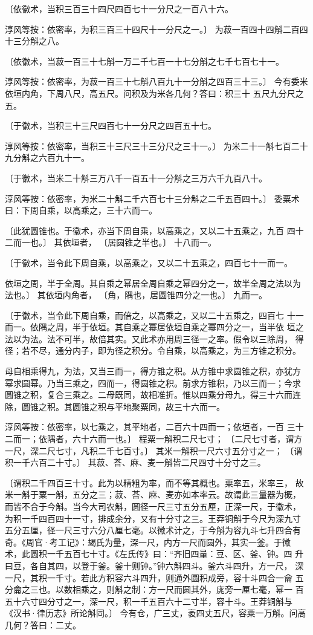 \documentclass[12pt,UTF8]{ctexbook}
\begin{document}
〔依徽术，当积三百三十四尺四百七十一分尺之一百八十六。

淳风等按：依密率，为积三百三十四尺十一分尺之一。〕 为菽一百四十四斛二百四十三分斛之八。

〔依徽术，当菽一百三十七斛一万二千七百一十七分斛之七千七百七十一。

淳风等按：依密率，为菽一百三十七斛八百九十一分斛之四百三十三。〕 今有委米依垣内角，下周八尺，高五尺。问积及为米各几何？答曰：积三十 五尺九分尺之五。

〔于徽术，当积三十三尺四百七十一分尺之四百五十七。

淳风等按：依密率，当积三十三尺三十三分尺之三十一。〕 为米二十一斛七百二十九分斛之六百九十一。

〔于徽术，当米二十斛三万八千一百五十一分斛之三万六千九百八十。

淳风等按：依密率，为米二十斛二千六百七十三分斛之二千五百四十。〕 委粟术曰：下周自乘，以高乘之，三十六而一。

〔此犹圆锥也。于徽术，亦当下周自乘，以高乘之，又以二十五乘之，九百 四十二而一也。〕 其依垣者， 〔居圆锥之半也。〕 十八而一。

〔于徽术，当令此下周自乘，以高乘之，又以二十五乘之，四百七十一而一。

依垣之周，半于全周。其自乘之幂居全周自乘之幂四分之一，故半全周之法以为 法也。〕 其依垣内角者， 〔角，隅也，居圆锥四分之一也。〕 九而一。

〔于徽术，当令此下周自乘，而倍之，以高乘之，又以二十五乘之，四百七 十一而一。依隅之周，半于依垣。其自乘之幂居依垣自乘之幂四分之一，当半依 垣之法以为法。法不可半，故倍其实。又此术亦用周三径一之率。假令以三除周， 得径；若不尽，通分内子，即为径之积分。令自乘，以高乘之，为三方锥之积分。

母自相乘得九，为法，又当三而一，得方锥之积。从方锥中求圆锥之积，亦犹方 幂求圆幂。乃当三乘之，四而一，得圆锥之积。前求方锥积，乃以三而一；今求 圆锥之积，复合三乘之。二母既同，故相准折。惟以四乘分母九，得三十六而连 除，圆锥之积。其圆锥之积与平地聚粟同，故三十六而一。

淳风等按：依密率，以七乘之，其平地者，二百六十四而一；依垣者，一百 三十二而一；依隅者，六十六而一也。〕 程粟一斛积二尺七寸； 〔二尺七寸者，谓方一尺，深二尺七寸，凡积二千七百寸。〕 其米一斛积一尺六寸五分寸之一； 〔谓积一千六百二十寸。〕 其菽、荅、麻、麦一斛皆二尺四寸十分寸之三。

〔谓积二千四百三十寸。此为以精粗为率，而不等其概也。粟率五，米率三， 故米一斛于粟一斛，五分之三；菽、荅、麻、麦亦如本率云。故谓此三量器为概， 而皆不合于今斛。当今大司农斛，圆径一尺三寸五分五厘，正深一尺，于徽术， 为积一千四百四十一寸，排成余分，又有十分寸之三。王莽铜斛于今尺为深九寸 五分五厘，径一尺三寸六分八厘七毫。以徽术计之，于今斛为容九斗七升四合有 奇。《周官·考工记》：朅氏为量，深一尺，内方一尺而圆外，其实一釜。于徽 术，此圆积一千五百七十寸。《左氏传》曰：“齐旧四量：豆、区、釜、钟。四 升曰豆，各自其四，以登于釜。釜十则钟。”钟六斛四斗。釜六斗四升，方一尺， 深一尺，其积一千寸。若此方积容六斗四升，则通外圆积成旁，容十斗四合一龠 五分龠之三也。以数相乘之，则斛之制：方一尺而圆其外，庣旁一厘七毫，幂一 百五十六寸四分寸之一，深一尺，积一千五百六十二寸半，容十斗。王莽铜斛与 《汉书·律历志》所论斛同。〕 今有仓，广三丈，袤四丈五尺，容粟一万斛。问高几何？答曰：二丈。
\end{document}
